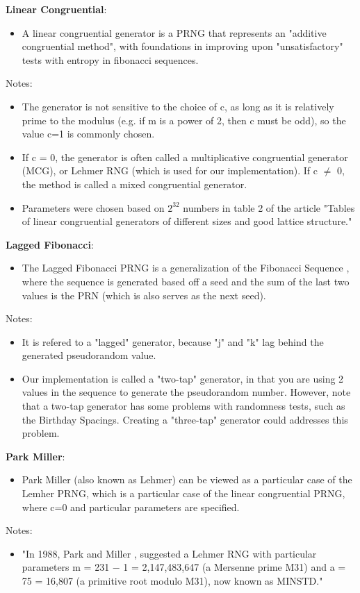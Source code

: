 \documentclass[conference]{IEEEtran}
\begin{document}
\noindent\textbf{Linear Congruential}:
\begin{itemize}
    \item A linear congruential generator is a PRNG that represents an "additive congruential method", with foundations in improving upon "unsatisfactory" tests with entropy in fibonacci sequences. \cite{10.1145/321008.321019}
\end{itemize}
Notes:
\begin{itemize}
    \item The generator is not sensitive to the choice of c, 
as long as it is relatively prime to the modulus 
(e.g. if m is a power of 2, then c must be odd), 
so the value c=1 is commonly chosen.
    \item If c = 0, the generator is often called a multiplicative
congruential generator (MCG), or Lehmer RNG (which is used for our implementation). If c $\neq$ 0, the
method is called a mixed congruential generator.
    \item Parameters were chosen based on $2^32$ numbers in table 2 of the article "Tables of linear congruential generators of different sizes and good lattice structure." \cite{LEcuyer1999TablesOL}
\end{itemize}


\noindent\textbf{Lagged Fibonacci}:
\begin{itemize}
    \item The Lagged Fibonacci PRNG is a generalization of the Fibonacci Sequence \cite{lucas1891calcul}, where the sequence is generated based off a seed and the sum of the last two values is the PRN (which is also serves as the next seed).
\end{itemize}
Notes:
\begin{itemize}
    \item It is refered to a "lagged" generator, because "j" and "k" lag behind the generated pseudorandom value. 
    \item Our implementation is called a "two-tap" generator, in that you are using 2 values in the sequence 
to generate the pseudorandom number. However, note that a two-tap generator has some problems with 
randomness tests, such as the Birthday Spacings. Creating a "three-tap" generator could
addresses this problem.
\end{itemize}


\noindent\textbf{Park Miller}:
\begin{itemize}
    \item Park Miller (also known as Lehmer) can be viewed as a particular case of the Lemher PRNG, which is a particular case of the linear congruential PRNG, where c=0 and particular parameters are specified.
\end{itemize}
Notes:
\begin{itemize}
    \item "In 1988, Park and Miller \cite{10.1145/63039.63042}, suggested a Lehmer RNG with particular parameters m = 231 − 1 = 2,147,483,647 (a Mersenne prime M31) and a = 75 = 16,807 (a primitive root modulo M31), now known as MINSTD." \cite{ParkMiller}
\end{itemize}
\end{document}
